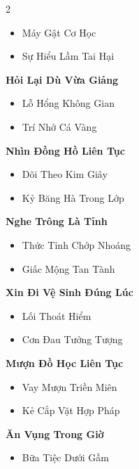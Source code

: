 \begin{multicols}{2}
\begin{itemize}[leftmargin=1.2em, itemsep=0.1em, label=\textcolor{titlecolor}{\tiny$\blacksquare$}]
  \item Máy Gật Cơ Học
  \item Sự Hiểu Lầm Tai Hại
\end{itemize}
\vspace{0.8em}
\textbf{\color{chapterline}Hỏi Lại Dù Vừa Giảng}
\begin{itemize}[leftmargin=1.2em, itemsep=0.1em, label=\textcolor{titlecolor}{\tiny$\blacksquare$}]
  \item Lỗ Hổng Không Gian
  \item Trí Nhớ Cá Vàng
\end{itemize}
\vspace{0.8em}
\textbf{\color{chapterline}Nhìn Đồng Hồ Liên Tục}
\begin{itemize}[leftmargin=1.2em, itemsep=0.1em, label=\textcolor{titlecolor}{\tiny$\blacksquare$}]
  \item Dõi Theo Kim Giây
  \item Kỷ Băng Hà Trong Lớp
\end{itemize}
\vspace{0.8em}
\textbf{\color{chapterline}Nghe Trông Là Tỉnh}
\begin{itemize}[leftmargin=1.2em, itemsep=0.1em, label=\textcolor{titlecolor}{\tiny$\blacksquare$}]
  \item Thức Tỉnh Chớp Nhoáng
  \item Giấc Mộng Tan Tành
\end{itemize}
\vspace{0.8em}
\textbf{\color{chapterline}Xin Đi Vệ Sinh Đúng Lúc}
\begin{itemize}[leftmargin=1.2em, itemsep=0.1em, label=\textcolor{titlecolor}{\tiny$\blacksquare$}]
  \item Lối Thoát Hiểm
  \item Cơn Đau Tưởng Tượng
\end{itemize}
\vspace{0.8em}
\textbf{\color{chapterline}Mượn Đồ Học Liên Tục}
\begin{itemize}[leftmargin=1.2em, itemsep=0.1em, label=\textcolor{titlecolor}{\tiny$\blacksquare$}]
  \item Vay Mượn Triền Miên
  \item Kẻ Cắp Vặt Hợp Pháp
\end{itemize}
\vspace{0.8em}
\textbf{\color{chapterline}Ăn Vụng Trong Giờ}
\begin{itemize}[leftmargin=1.2em, itemsep=0.1em, label=\textcolor{titlecolor}{\tiny$\blacksquare$}]
  \item Bữa Tiệc Dưới Gầm

\end{itemize}
\end{multicols}
